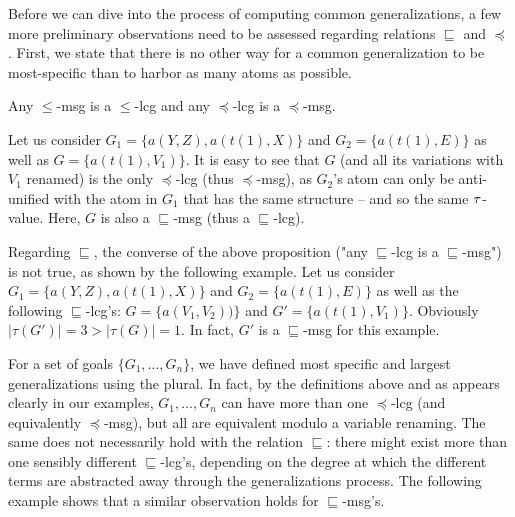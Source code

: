 Before we can dive into the process of computing common generalizations, a few more preliminary observations need to be assessed regarding relations $\sqsubseteq$ and $\preceq$. First, 
%
we state that there is no other way for a common generalization to be most-specific than to harbor as many atoms as possible.
\begin{proposition}\label{prop-msg-lcg}\label{prop-msg-lcg-preceq}
	Any $\leqslant$-msg is a $\leqslant$-lcg and any $\preceq$-lcg is a $\preceq$-msg. 
\end{proposition}	

\begin{example} 
	Let us consider $G_1 = \{a(Y,Z), a(t(1), X)\}$ and $G_2 = \{a(t(1), E)\}$ as well as $G = \{a(t(1), V_1)\}$. It is easy to see that $G$ (and all its variations with $V_1$ renamed) is the only $\preceq$-lcg (thus $\preceq$-msg), as $G_2$'s atom can only be anti-unified with the atom in $G_1$ that has the same structure -- and so the same $\tau$-value. Here, $G$ is also a $\sqsubseteq$-msg (thus a  $\sqsubseteq$-lcg).
\end{example} 

Regarding $\sqsubseteq$, the converse of the above proposition ("any $\sqsubseteq$-lcg is a $\sqsubseteq$-msg") is not true, as shown by the following example.
Let us consider $G_1 = \{a(Y,Z), a(t(1), X)\}$ and $G_2 = \{a(t(1), E)\}$ as well as the following $\sqsubseteq$-lcg's: $G = \{a(V_1,V_2))\}$ and $G' = \{a(t(1), V_1)\}$. Obviously $|\tau(G')| = 3 >|\tau(G)| = 1$. In fact, $G'$ is a $\sqsubseteq$-msg for this example. 

For a set of goals $\{G_1,\dots,G_n\}$, we have defined most specific and largest generalizations using the plural. In fact, by the definitions above and as appears clearly in our examples, $G_1, \dots, G_n$ can have more than one $\preceq$-lcg (and equivalently $\preceq$-msg), but all are equivalent modulo a variable renaming. The same does not necessarily hold with the relation $\sqsubseteq$: %
there might exist more than one sensibly different $\sqsubseteq$-lcg's, depending on the degree at which the different terms are abstracted away through the generalizations process. The following example shows that a similar observation holds for $\sqsubseteq$-msg's. 


